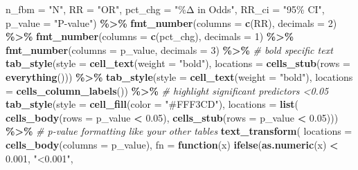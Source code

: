 \documentclass[
]{article}
\newenvironment{Shaded}{\begin{snugshade}}{\end{snugshade}}
\newcommand{\AttributeTok}[1]{\textcolor[rgb]{0.13,0.29,0.53}{#1}}
\newcommand{\CommentTok}[1]{\textcolor[rgb]{0.56,0.35,0.01}{\textit{#1}}}
\newcommand{\ControlFlowTok}[1]{\textcolor[rgb]{0.13,0.29,0.53}{\textbf{#1}}}
\newcommand{\DecValTok}[1]{\textcolor[rgb]{0.00,0.00,0.81}{#1}}
\newcommand{\FloatTok}[1]{\textcolor[rgb]{0.00,0.00,0.81}{#1}}
\newcommand{\FunctionTok}[1]{\textcolor[rgb]{0.13,0.29,0.53}{\textbf{#1}}}
\newcommand{\NormalTok}[1]{#1}
\newcommand{\SpecialCharTok}[1]{\textcolor[rgb]{0.81,0.36,0.00}{\textbf{#1}}}
\newcommand{\StringTok}[1]{\textcolor[rgb]{0.31,0.60,0.02}{#1}}
\begin{document}
\begin{Shaded}
\begin{Highlighting}[]
    \AttributeTok{n\_fbm =} \StringTok{"N"}\NormalTok{, }
    \AttributeTok{RR =} \StringTok{"OR"}\NormalTok{,}
    \AttributeTok{pct\_chg =} \StringTok{"\%Δ in Odds"}\NormalTok{,}
    \AttributeTok{RR\_ci =} \StringTok{"95\% CI"}\NormalTok{,}
    \AttributeTok{p\_value  =} \StringTok{"P{-}value"}\NormalTok{) }\SpecialCharTok{\%\textgreater{}\%}
  \FunctionTok{fmt\_number}\NormalTok{(}\AttributeTok{columns =} \FunctionTok{c}\NormalTok{(RR), }\AttributeTok{decimals =} \DecValTok{2}\NormalTok{) }\SpecialCharTok{\%\textgreater{}\%}
  \FunctionTok{fmt\_number}\NormalTok{(}\AttributeTok{columns =} \FunctionTok{c}\NormalTok{(pct\_chg), }\AttributeTok{decimals =} \DecValTok{1}\NormalTok{) }\SpecialCharTok{\%\textgreater{}\%}
  \FunctionTok{fmt\_number}\NormalTok{(}\AttributeTok{columns =}\NormalTok{ p\_value, }\AttributeTok{decimals =} \DecValTok{3}\NormalTok{) }\SpecialCharTok{\%\textgreater{}\%}
    \CommentTok{\# bold specific text}
  \FunctionTok{tab\_style}\NormalTok{(}\AttributeTok{style =} \FunctionTok{cell\_text}\NormalTok{(}\AttributeTok{weight =} \StringTok{"bold"}\NormalTok{),}
    \AttributeTok{locations =} \FunctionTok{cells\_stub}\NormalTok{(}\AttributeTok{rows =} \FunctionTok{everything}\NormalTok{())) }\SpecialCharTok{\%\textgreater{}\%}
  \FunctionTok{tab\_style}\NormalTok{(}\AttributeTok{style =} \FunctionTok{cell\_text}\NormalTok{(}\AttributeTok{weight =} \StringTok{"bold"}\NormalTok{),}
    \AttributeTok{locations =} \FunctionTok{cells\_column\_labels}\NormalTok{()) }\SpecialCharTok{\%\textgreater{}\%}
  \CommentTok{\# highlight significant predictors \textless{}0.05}
  \FunctionTok{tab\_style}\NormalTok{(}\AttributeTok{style =} \FunctionTok{cell\_fill}\NormalTok{(}\AttributeTok{color =} \StringTok{"\#FFF3CD"}\NormalTok{),}
            \AttributeTok{locations =} \FunctionTok{list}\NormalTok{(}
              \FunctionTok{cells\_body}\NormalTok{(}\AttributeTok{rows =}\NormalTok{ p\_value }\SpecialCharTok{\textless{}} \FloatTok{0.05}\NormalTok{),}
              \FunctionTok{cells\_stub}\NormalTok{(}\AttributeTok{rows =}\NormalTok{ p\_value }\SpecialCharTok{\textless{}} \FloatTok{0.05}\NormalTok{))) }\SpecialCharTok{\%\textgreater{}\%} 
  \CommentTok{\# p{-}value formatting like your other tables}
  \FunctionTok{text\_transform}\NormalTok{(}
    \AttributeTok{locations =} \FunctionTok{cells\_body}\NormalTok{(}\AttributeTok{columns =}\NormalTok{ p\_value),}
    \AttributeTok{fn =} \ControlFlowTok{function}\NormalTok{(x) }\FunctionTok{ifelse}\NormalTok{(}\FunctionTok{as.numeric}\NormalTok{(x) }\SpecialCharTok{\textless{}} \FloatTok{0.001}\NormalTok{, }\StringTok{"\textless{}0.001"}\NormalTok{,}

\end{Highlighting}
\end{Shaded}
\end{document}
